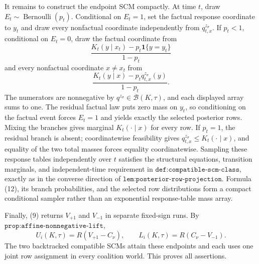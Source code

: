 It remains to construct the endpoint SCM compactly.  At time \(t\), draw \(E_t\sim\operatorname{Bernoulli}(p_t)\).  Conditional on \(E_t=1\), set the factual response coordinate to \(y_t\) and draw every nonfactual coordinate independently from \(q^{z_\sigma}_{t,x}\).  If \(p_t<1\), conditional on \(E_t=0\), draw the factual coordinate from
\[
 \frac{K_t(y\mid x_t)-p_t\mathbf 1\{y=y_t\}}{1-p_t}
\]
and every nonfactual coordinate \(x\ne x_t\) from
\[
 \frac{K_t(y\mid x)-p_tq^{z_\sigma}_{t,x}(y)}{1-p_t}.
 \tag{12}
\]
The numerators are nonnegative by \(q^{z_\sigma}\in\mathcal B(K,\tau)\), and each displayed array sums to one.  The residual factual law puts zero mass on \(y_t\), so conditioning on the factual event forces \(E_t=1\) and yields exactly the selected posterior rows.  Mixing the branches gives marginal \(K_t(\cdot\mid x)\) for every row.  If \(p_t=1\), the residual branch is absent; coordinatewise feasibility gives \(q^{z_\sigma}_{t,x}\le K_t(\cdot\mid x)\), and equality of the two total masses forces equality coordinatewise.  Sampling these response tables independently over \(t\) satisfies the structural equations, transition marginals, and independent-time requirement in \(\texttt{def:compatible-scm-class}\), exactly as in the converse direction of \(\texttt{lem:posterior-row-projection}\).  Formula (12), its branch probabilities, and the selected row distributions form a compact conditional sampler rather than an exponential response-table mass array.

Finally, (9) returns \(V_{+1}\) and \(V_{-1}\) in separate fixed-sign runs.  By \(\texttt{prop:affine-nonnegative-lift}\),
\[
 U_i(K,\tau)=R(V_{+1}-C_\nu),
 \qquad
 L_i(K,\tau)=R(C_\nu-V_{-1}).
\]
The two backtracked compatible SCMs attain these endpoints and each uses one joint row assignment in every coalition world.  This proves all assertions.